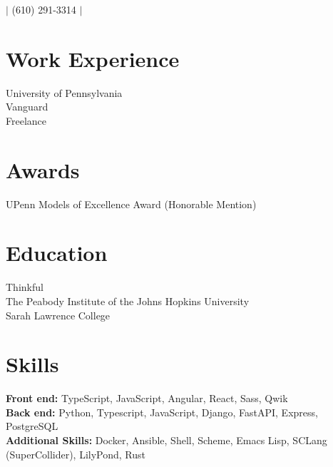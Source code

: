 \documentclass{article}
\begin{document}

$|$
\small{(610) 291-3314}
$|$

\section{Work Experience}

University of Pennsylvania \\
Vanguard \\
Freelance \\

\section{Awards}

UPenn Models of Excellence Award (Honorable Mention)

\section{Education}

Thinkful \\
The Peabody Institute of the Johns Hopkins University \\
Sarah Lawrence College

\section{Skills}

\textbf{Front end:} TypeScript, JavaScript, Angular, React, Sass, Qwik \\
\textbf{Back end:} Python, Typescript, JavaScript, Django, FastAPI, Express,
  PostgreSQL \\
\textbf{Additional Skills:} Docker, Ansible, Shell, Scheme, Emacs Lisp, SCLang
  (SuperCollider), LilyPond, Rust
\end{document}
